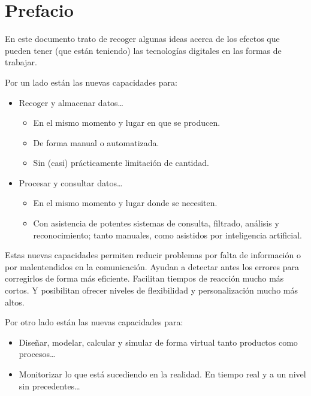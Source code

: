 \documentclass[spanish,12pt,a4paper,final,oneside]{book}
\begin{document}
\hypersetup{linkcolor=black}
\tableofcontents


\section*{Prefacio}
En este documento trato de recoger algunas ideas acerca de los efectos que pueden tener (que están teniendo) las tecnologías digitales en las formas de trabajar.

\vspace{1cm}
Por un lado están las nuevas capacidades para:
\begin{itemize}

\item Recoger y almacenar datos\ldots
\begin{itemize}
\item En el mismo momento y lugar en que se producen.
\item De forma manual o automatizada.
\item Sin (casi) prácticamente limitación de cantidad.
\end{itemize}

\item Procesar y consultar datos\ldots
\begin{itemize}
\item En el mismo momento y lugar donde se necesiten.
\item Con asistencia de potentes sistemas de consulta, filtrado, análisis y reconocimiento; tanto manuales, como asistidos por inteligencia artificial.
\end{itemize}

\end{itemize}

Estas nuevas capacidades permiten reducir problemas por falta de información o por malentendidos en la comunicación. Ayudan a detectar antes los errores para corregirlos de forma más eficiente. Facilitan tiempos de reacción mucho más cortos. Y posibilitan ofrecer niveles de flexibilidad y personalización mucho más altos. 



\vspace{2cm}
Por otro lado están las nuevas capacidades para:

\begin{itemize}
\item Diseñar, modelar, calcular y simular de forma virtual tanto productos como procesos\ldots 
\item Monitorizar lo que está sucediendo en la realidad. En tiempo real y a un nivel sin precedentes\ldots
\end{itemize}
\end{document}
